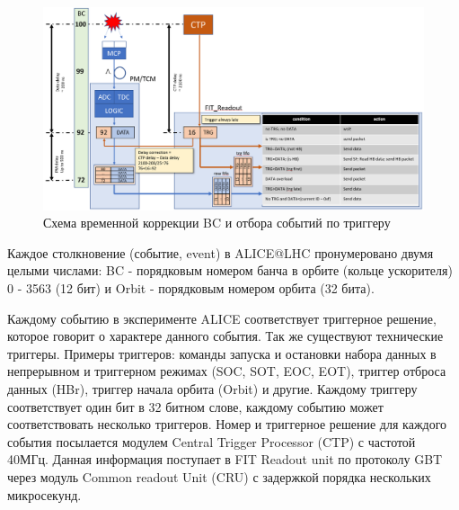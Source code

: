 \documentclass{article}
\begin{document}
\begin{figure}[H]
	\centering 
	\includegraphics[width=1\textwidth]{BCIDcorr.png}
	\caption{\label{fig:3} Схема временной коррекции BC и отбора событий по триггеру}
\end{figure}


Каждое столкновение (событие, event) в ALICE@LHC пронумеровано двумя целыми числами: BC - порядковым номером банча в орбите (кольце ускорителя) 0 - 3563 (12 бит) и Orbit - порядковым номером орбита (32 бита).

Каждому событию в эксперименте ALICE соответствует триггерное решение, которое говорит о характере данного события. Так же существуют технические триггеры. Примеры триггеров: команды запуска и остановки набора данных в непрерывном и триггерном режимах (SOC, SOT, EOC, EOT), триггер отброса данных (HBr), триггер начала орбита (Orbit) и другие. Каждому триггеру соответствует один бит в 32 битном слове, каждому событию может соответствовать несколько триггеров. Номер и триггерное решение для каждого события посылается модулем Central Trigger Processor (CTP) с частотой 40МГц. Данная информация поступает в FIT Readout unit по протоколу GBT через модуль Common readout Unit (CRU) с задержкой порядка нескольких микросекунд.
\end{document}
